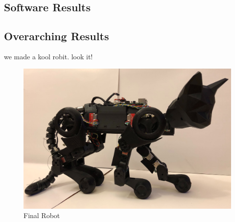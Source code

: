 \subsection{Software Results}

\subsection{Overarching Results}
we made a kool robit. look it!
\begin{figure}[H]
            \centering
            \includegraphics[width=120mm]{figures/FinalRobot.jpg}
            \caption{Final Robot}
            \label{fig:FinalRobot}
        \end{figure}
